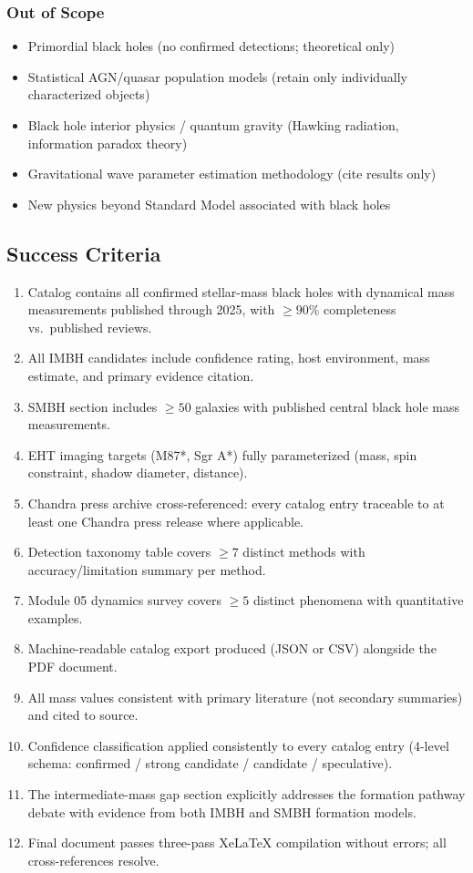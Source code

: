 \documentclass[11pt,letterpaper]{article}
\begin{document}
\subsubsection{Out of Scope}

\begin{itemize}[leftmargin=1.5em]
  \item Primordial black holes (no confirmed detections; theoretical only)
  \item Statistical AGN/quasar population models (retain only individually characterized objects)
  \item Black hole interior physics / quantum gravity (Hawking radiation, information paradox theory)
  \item Gravitational wave parameter estimation methodology (cite results only)
  \item New physics beyond Standard Model associated with black holes
\end{itemize}

\subsection{Success Criteria}

\begin{enumerate}
  \item Catalog contains all confirmed stellar-mass black holes with dynamical mass measurements published through 2025, with $\geq90\%$ completeness vs.\ published reviews.
  \item All IMBH candidates include confidence rating, host environment, mass estimate, and primary evidence citation.
  \item SMBH section includes $\geq50$ galaxies with published central black hole mass measurements.
  \item EHT imaging targets (M87*, Sgr A*) fully parameterized (mass, spin constraint, shadow diameter, distance).
  \item Chandra press archive cross-referenced: every catalog entry traceable to at least one Chandra press release where applicable.
  \item Detection taxonomy table covers $\geq7$ distinct methods with accuracy/limitation summary per method.
  \item Module 05 dynamics survey covers $\geq5$ distinct phenomena with quantitative examples.
  \item Machine-readable catalog export produced (JSON or CSV) alongside the PDF document.
  \item All mass values consistent with primary literature (not secondary summaries) and cited to source.
  \item Confidence classification applied consistently to every catalog entry (4-level schema: confirmed / strong candidate / candidate / speculative).
  \item The intermediate-mass gap section explicitly addresses the formation pathway debate with evidence from both IMBH and SMBH formation models.
  \item Final document passes three-pass XeLaTeX compilation without errors; all cross-references resolve.
\end{enumerate}
\end{document}
